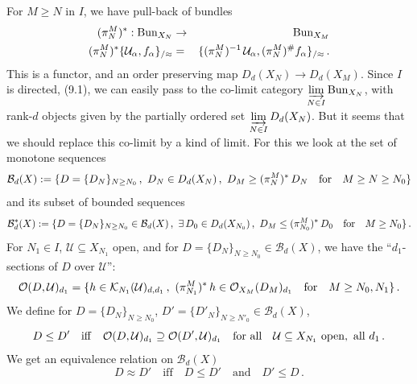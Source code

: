 \documentclass[leqno]{article}
\numberwithin{equation}{section}
\begin{document}
For $M \geq N$ in $I$, we have pull-back of bundles
\begin{eqnarray}
\label{eq1110}
(\pi_N^M)^* : {\rm Bun}_{X_N} &\to &{\rm Bun}_{X_M} \\
(\pi_N^M)^* \{{\mathcal U}_{\alpha} , f_{\alpha}\}_{/\approx} &= &\{(\pi_N^M)^{-1} \, {\mathcal U}_{\alpha} , (\pi_N^M)^{\#} f_{\alpha} \}_{/\approx} \, . \nonumber
\end{eqnarray}
This is a functor, and an order preserving map $D_d (X_N) \to D_d (X_M)$. Since $I$ is directed, (9.1), we can easily pass to the co-limit category $\underset{N \in I}{\varinjlim} \, {\rm Bun}_{X_N}$, with rank-$d$ objects given by the partially ordered set $\underset{N \in I}{\varinjlim} \, D_d (X_N)$. But it seems that we should replace this co-limit by a kind of limit. For this we look at the set of monotone sequences
\begin{equation}
\label{eq1111}
{\mathcal B}_d (X) := \{D = \{ D_N\}_{N \geq N_0} \, , \ D_N \in D_d (X_N) \, , \ D_M \geq (\pi_N^M)^* \, D_N \quad {\rm for} \quad M \geq N \geq N_0 \}
\end{equation}
and its subset of bounded sequences
\begin{equation}
\label{eq1112}
{\mathcal B}_d^* (X) := \{D = \{ D_N\}_{N \geq N_0} \in {\mathcal B}_d (X) \, , \  \exists \, D_0 \in D_d (X_{N_0}) \, , \ D_M \leq (\pi_{N_0}^M)^* \, D_0 \quad {\rm for} \quad M \geq N_0 \} \, .
\end{equation}
For $N_1 \in I$, ${\mathcal U} \subseteq X_{N_1}$ open, and for $D = \{D_N\}_{N \geq N_0} \in {\mathcal B}_d(X)$, we have the ``$d_1$-sections of $D$ over ${\mathcal U}$'':
\begin{equation}
\label{eq1113}
{\mathcal O} (D,{\mathcal U})_{d_1} = \{ h \in {\mathcal K}_{N_1} ({\mathcal U})_{d,d_1} \, , \ (\pi_{N_1}^M)^* \, h \in {\mathcal O}_{X_M} (D_M)_{d_1} \quad {\rm for} \quad M \geq N_0 , N_1 \} \, .
\end{equation}
We define for $D = \{D_N \}_{N \geq N_0}$, $D' = \{D'_N\}_{N \geq N'_0} \in {\mathcal B}_d(X)$,
\begin{equation}
\label{eq1114}
D \leq D' \quad {\rm iff} \quad {\mathcal O} (D,{\mathcal U})_{d_1} \supseteq {\mathcal O} (D' , {\mathcal U})_{d_1} \quad \mbox{for all} \quad {\mathcal U} \subseteq X_{N_1} \ {\rm open}, \ {\rm all} \ d_1 \, .
\end{equation}
We get an equivalence relation on ${\mathcal B}_d (X)$
\begin{equation}
\label{eq1115}
D \approx D' \quad \mbox{iff} \quad D \leq D' \quad \mbox{and} \quad D' \leq D \, .
\end{equation}
\end{document}
